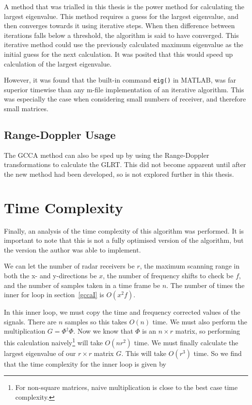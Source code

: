 \documentclass[12pt,openany,a4paper]{book}
\begin{document}
A method that was trialled in this thesis is the power method for calculating the largest eigenvalue. This method requires a guess for the largest eigenvalue, and then converges towards it using iterative steps. When then difference between iterations falls below a threshold, the algorithm is said to have converged. This iterative method could use the previously calculated maximum eigenvalue as the initial guess for the next calculation. It was posited that this would speed up calculation of the largest eigenvalue.

\bigskip

However, it was found that the built-in command \verb+eig()+ in MATLAB, was far superior timewise than any m-file implementation of an iterative algorithm. This was especially the case when considering small numbers of receiver, and therefore small matrices.

\subsection{Range-Doppler Usage}
The GCCA method can also be sped up by using the Range-Doppler transformations to calculate the GLRT. This did not become apparent until after the new method had been developed, so is not explored further in this thesis.


\section{Time Complexity}
\label{sec:timecomp}
Finally, an analysis of the time complexity of this algorithm was performed. It is important to note that this is not a fully optimised version of the algorithm, but the version the author was able to implement.

\bigskip

We can let the number of radar receivers be $r$, the maximum scanning range in both the x- and y-directions be $x$, the number of frequency shifts to check be $f$, and the number of samples taken in a time frame be $n$. The number of times the inner for loop in section~\ref{gccaI} is $O(x^2f)$.

\bigskip

In this inner loop, we must copy the time and frequency corrected values of the signals. There are $n$ samples so this takes $O(n)$ time. We must also perform the multiplication $G = \Phi^\dagger \Phi$. Now we know that $\Phi$ is an $n\times r$ matrix, so performing this calculation naively\footnote{For non-square matrices, naive multiplication is close to the best case time complexity.} will take $O(nr^2)$ time. We must finally calculate the largest eigenvalue of our $r\times r$ matrix $G$. This will take $O(r^3)$ time. So we find that the time complexity for the inner loop is given by
\end{document}
